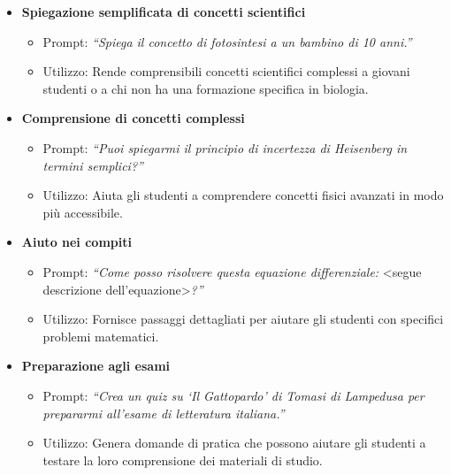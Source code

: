             \begin{itemize}
                \item \textbf{Spiegazione semplificata di concetti scientifici}
                \begin{itemize}
                    \item Prompt: \textit{``Spiega il concetto di fotosintesi a un bambino di 10 anni.''}
                    \item Utilizzo: Rende comprensibili concetti scientifici complessi a giovani studenti o a chi non ha una formazione specifica in biologia.
                \end{itemize}
                
                \item \textbf{Comprensione di concetti complessi}
                \begin{itemize}
                    \item Prompt: \textit{``Puoi spiegarmi il principio di incertezza di Heisenberg in termini semplici?''}
                    \item Utilizzo: Aiuta gli studenti a comprendere concetti fisici avanzati in modo più accessibile.
                \end{itemize}
                
                \item \textbf{Aiuto nei compiti}
                \begin{itemize}
                    \item Prompt: \textit{``Come posso risolvere questa equazione differenziale: }\textless{}segue descrizione dell'equazione\textgreater{}\textit{?''}
                    \item Utilizzo: Fornisce passaggi dettagliati per aiutare gli studenti con specifici problemi matematici.
                \end{itemize}
                
                \item \textbf{Preparazione agli esami}
                \begin{itemize}
                    \item Prompt: \textit{``Crea un quiz su `Il Gattopardo' di Tomasi di Lampedusa per prepararmi all'esame di letteratura italiana.''}
                    \item Utilizzo: Genera domande di pratica che possono aiutare gli studenti a testare la loro comprensione dei materiali di studio.
                \end{itemize}
                

\end{itemize}
